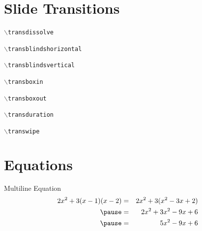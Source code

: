 \documentclass{beamer}
\begin{document}
\section[Transitions]{Slide Transitions}

\begin{frame}{\texttt{$\backslash$transdissolve}}
\transdissolve
\lipsum[1-1]
\end{frame}

\begin{frame}{\texttt{$\backslash$transblindshorizontal}}
\transblindshorizontal
\lipsum[2-2]
\end{frame}

\begin{frame}{\texttt{$\backslash$transblindsvertical}}
\transblindsvertical
\lipsum[3-3]
\end{frame}

\begin{frame}{\texttt{$\backslash$transboxin}}
\transboxin
\lipsum[4-4]
\end{frame}

\begin{frame}{\texttt{$\backslash$transboxout}}
\transboxout
\lipsum[5-5]
\end{frame}

\begin{frame}{\texttt{$\backslash$transduration}}
\lipsum[12-12]
\end{frame}

\begin{frame}{\texttt{$\backslash$transwipe}}
\transwipe
\lipsum[11-11]
\end{frame}

\section[Maths]{Equations}

\begin{frame}{Multiline Equation}
\begin{eqnarray}
2x^2 + 3(x-1)(x-2)&=&2x^2 + 3(x^2-3x+2)\\
\pause &=& 2x^2 + 3x^2 - 9x + 6\\
\pause &=& 5x^2 - 9x + 6
\end{eqnarray}    
\end{frame}
\end{document}

